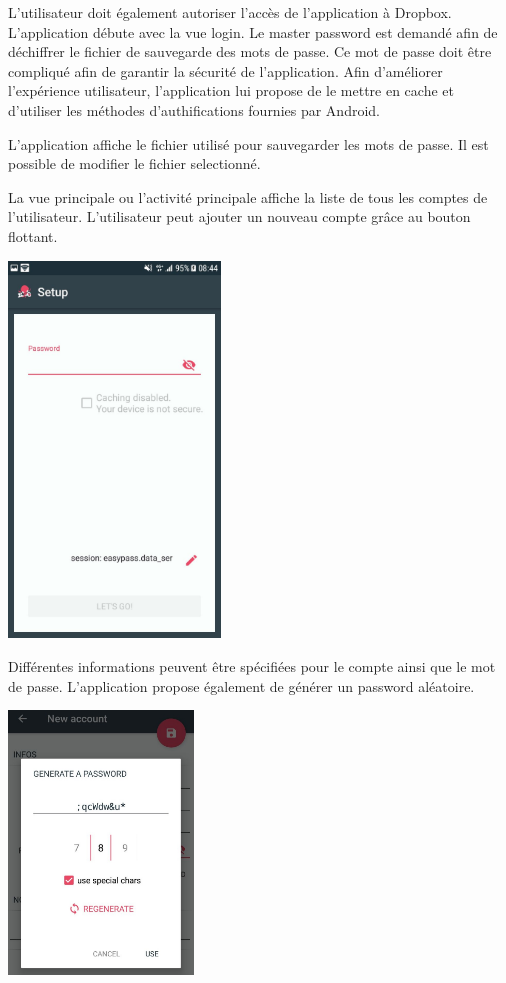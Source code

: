 L'utilisateur doit également autoriser l'accès de l'application à Dropbox.
L'application débute avec la vue login. Le master password est demandé afin de déchiffrer le fichier de sauvegarde des mots de passe. Ce mot de passe doit être compliqué afin de garantir la sécurité de l'application. Afin d'améliorer l'expérience utilisateur, l'application \easypass{} lui propose de le mettre en cache et d'utiliser les méthodes d'authifications fournies par Android.

L'application affiche le fichier utilisé pour sauvegarder les mots de passe. Il est possible de modifier le fichier selectionné.

La vue principale ou l'activité principale affiche la liste de tous les comptes de l'utilisateur. L'utilisateur peut ajouter un nouveau compte grâce au bouton flottant.

\includegraphics[height=10cm]{login.jpg}

Différentes informations peuvent être spécifiées pour le compte ainsi que le mot de passe. L'application \easypass{} propose également de générer un password aléatoire.

\includegraphics[height=7cm]{generate_password.jpg}

